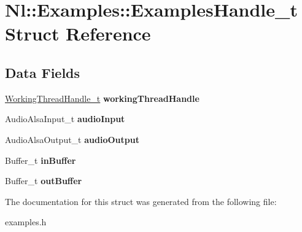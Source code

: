\hypertarget{structNl_1_1Examples_1_1ExamplesHandle__t}{}\section{Nl\+:\+:Examples\+:\+:Examples\+Handle\+\_\+t Struct Reference}
\label{structNl_1_1Examples_1_1ExamplesHandle__t}
\subsection*{Data Fields}
\begin{DoxyCompactItemize}
\item 
\hypertarget{structNl_1_1Examples_1_1ExamplesHandle__t_a5272aaa5db74c9438f54bdb7cbc169d8}{}\hyperlink{structNl_1_1WorkingThreadHandle__t}{Working\+Thread\+Handle\+\_\+t} {\bfseries working\+Thread\+Handle}\label{structNl_1_1Examples_1_1ExamplesHandle__t_a5272aaa5db74c9438f54bdb7cbc169d8}

\item 
\hypertarget{structNl_1_1Examples_1_1ExamplesHandle__t_a8b4d5a44a7db30591cfbe25d5eda6911}{}Audio\+Alsa\+Input\+\_\+t {\bfseries audio\+Input}\label{structNl_1_1Examples_1_1ExamplesHandle__t_a8b4d5a44a7db30591cfbe25d5eda6911}

\item 
\hypertarget{structNl_1_1Examples_1_1ExamplesHandle__t_a9fb7b28a581f17dbc4424298cd798633}{}Audio\+Alsa\+Output\+\_\+t {\bfseries audio\+Output}\label{structNl_1_1Examples_1_1ExamplesHandle__t_a9fb7b28a581f17dbc4424298cd798633}

\item 
\hypertarget{structNl_1_1Examples_1_1ExamplesHandle__t_a39c9fe84dcd8c356862cefde67bb3dae}{}Buffer\+\_\+t {\bfseries in\+Buffer}\label{structNl_1_1Examples_1_1ExamplesHandle__t_a39c9fe84dcd8c356862cefde67bb3dae}

\item 
\hypertarget{structNl_1_1Examples_1_1ExamplesHandle__t_ade476a27e7d46874f307ad2c58872f04}{}Buffer\+\_\+t {\bfseries out\+Buffer}\label{structNl_1_1Examples_1_1ExamplesHandle__t_ade476a27e7d46874f307ad2c58872f04}

\end{DoxyCompactItemize}


The documentation for this struct was generated from the following file\+:\begin{DoxyCompactItemize}
\item 
examples.\+h\end{DoxyCompactItemize}
